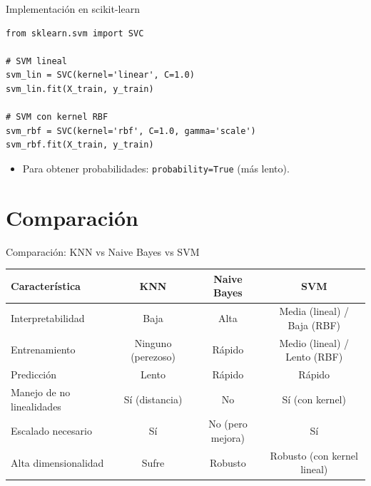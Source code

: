 \documentclass[aspectratio=169, 10pt, xcolor=table]{beamer}
\begin{document}
\begin{frame}[fragile]{Implementación en scikit-learn}
    \begin{lstlisting}
from sklearn.svm import SVC

# SVM lineal
svm_lin = SVC(kernel='linear', C=1.0)
svm_lin.fit(X_train, y_train)

# SVM con kernel RBF
svm_rbf = SVC(kernel='rbf', C=1.0, gamma='scale')
svm_rbf.fit(X_train, y_train)
    \end{lstlisting}
    \begin{itemize}
        \item Para obtener probabilidades: \texttt{probability=True} (más lento).
    \end{itemize}
\end{frame}

\section{Comparación}

\begin{frame}{Comparación: KNN vs Naive Bayes vs SVM}
    \begin{table}
        \centering
        \renewcommand{\arraystretch}{1.3}
        \begin{tabular}{l|c|c|c}
            \toprule
            \textbf{Característica} & \textbf{KNN} & \textbf{Naive Bayes} & \textbf{SVM} \\
            \midrule
            Interpretabilidad & Baja & Alta & Media (lineal) / Baja (RBF) \\
            Entrenamiento & Ninguno (perezoso) & Rápido & Medio (lineal) / Lento (RBF) \\
            Predicción & Lento & Rápido & Rápido \\
            Manejo de no linealidades & Sí (distancia) & No & Sí (con kernel) \\
            Escalado necesario & Sí & No (pero mejora) & Sí \\
            Alta dimensionalidad & Sufre & Robusto & Robusto (con kernel lineal) \\
            \bottomrule
        \end{tabular}
    \end{table}
\end{frame}
\end{document}
